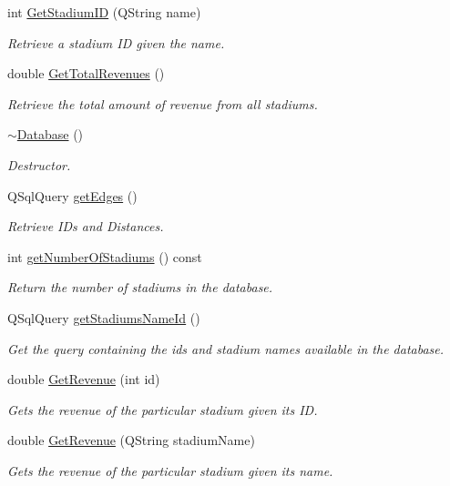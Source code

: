 \begin{DoxyCompactItemize}
int \hyperlink{class_database_af3530b05506d54e45bd8fbdbcb72495d}{Get\+Stadium\+ID} (Q\+String name)
\begin{DoxyCompactList}\small\item\em Retrieve a stadium ID given the name. \end{DoxyCompactList}\item 
double \hyperlink{class_database_ac4b525f1a61d1b4fd11c81bd3b2c92b0}{Get\+Total\+Revenues} ()
\begin{DoxyCompactList}\small\item\em Retrieve the total amount of revenue from all stadiums. \end{DoxyCompactList}\item 
\hyperlink{class_database_a84d399a2ad58d69daab9b05330e1316d}{$\sim$\+Database} ()
\begin{DoxyCompactList}\small\item\em Destructor. \end{DoxyCompactList}\item 
Q\+Sql\+Query \hyperlink{class_database_a7a273ea995fbd9063ce67e46dbbadd27}{get\+Edges} ()
\begin{DoxyCompactList}\small\item\em Retrieve I\+Ds and Distances. \end{DoxyCompactList}\item 
int \hyperlink{class_database_a6d214ff690fe02bfade1943240c2bd27}{get\+Number\+Of\+Stadiums} () const 
\begin{DoxyCompactList}\small\item\em Return the number of stadiums in the database. \end{DoxyCompactList}\item 
Q\+Sql\+Query \hyperlink{class_database_a26fee1a206ddc5b9ed89242cfba29f92}{get\+Stadiums\+Name\+Id} ()
\begin{DoxyCompactList}\small\item\em Get the query containing the ids and stadium names available in the database. \end{DoxyCompactList}\item 
double \hyperlink{class_database_ac303418b93547f5106af47c542c7623b}{Get\+Revenue} (int id)
\begin{DoxyCompactList}\small\item\em Gets the revenue of the particular stadium given its ID. \end{DoxyCompactList}\item 
double \hyperlink{class_database_abff0f7f77d9a3a3b2ea62930c5935cf9}{Get\+Revenue} (Q\+String stadium\+Name)
\begin{DoxyCompactList}\small\item\em Gets the revenue of the particular stadium given its name. \end{DoxyCompactList}\end{DoxyCompactItemize}


